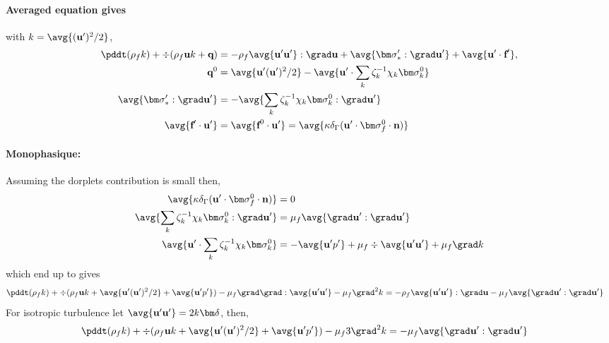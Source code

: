 \paragraph{Averaged equation gives }
with $k = \avg{(\textbf{u}')^2/2}$,
\begin{align*}
    \pddt(\rho_f k )
    + \div (
        \rho_f \textbf{u} k
        + \textbf{q}
        )
    &= 
    - \rho_f \avg{\textbf{u}'\textbf{u}'}:\grad \textbf{u}
    + \avg{\bm\sigma_*' : \grad \textbf{u}'}
    + \avg{\textbf{u}'\cdot \textbf{f}'},\\
    \textbf{q}^0 &= 
    \avg{\textbf{u}' (\textbf{u}')^2/2}
    - \avg{\textbf{u}' \cdot \sum_k \zeta^{-1}_k \chi_k \bm\sigma_k^0}
    \\
    \avg{\bm\sigma_*': \grad \textbf{u}'}
    &=
    -\avg{\sum_k \zeta^{-1}_k \chi_k \bm\sigma_k^0  :\grad \textbf{u}'}\\
    \avg{\textbf{f}'\cdot \textbf{u}'}
    &=
    \avg{\textbf{f}^0 \cdot \textbf{u}'}
    = 
    \avg{\kappa \delta_\Gamma (\textbf{u}'\cdot \bm\sigma_f^0 \cdot \textbf{n})}
\end{align*}
\paragraph{Monophasique: }
Assuming the dorplets contribution is small then, 
\begin{align}
    \avg{\kappa \delta_\Gamma (\textbf{u}'\cdot \bm\sigma_f^0 \cdot \textbf{n})}&= 0 \\
    \avg{\sum_k \zeta^{-1}_k \chi_k \bm\sigma_k^0  :\grad \textbf{u}'}
    &=
    \mu_f \avg{ \grad \textbf{u}'  :\grad \textbf{u}'}\\
    \avg{\textbf{u}' \cdot \sum_k \zeta^{-1}_k \chi_k \bm\sigma_k^0}
    &=
    -\avg{\textbf{u}' p'}
    + 
    \mu_f \div \avg{\textbf{u}'\textbf{u}'}  + \mu_f  \grad k 
\end{align}
which end up to gives 
\begin{align*}
    \pddt(\rho_f k )
    + \div (
        \rho_f \textbf{u} k
        +\avg{\textbf{u}' (\textbf{u}')^2/2}
        + \avg{\textbf{u}' p'}
        )
    - \mu_f \grad\grad : \avg{\textbf{u}'\textbf{u}'}  
    - \mu_f  \grad^2 k 
    &= 
    - \rho_f \avg{\textbf{u}'\textbf{u}'}:\grad \textbf{u}
    - \mu_f \avg{\grad \textbf{u}':\grad \textbf{u}'}
\end{align*}
For isotropic turbulence let $\avg{\textbf{u}'\textbf{u}'} = 2 k \bm\delta$, then, 
\begin{align*}
    \pddt(\rho_f k )
    + \div (
        \rho_f \textbf{u} k
        +\avg{\textbf{u}' (\textbf{u}')^2/2}
        + \avg{\textbf{u}' p'}
        )
    - \mu_f  3\grad^2 k 
    &= 
    - \mu_f \avg{\grad \textbf{u}':\grad \textbf{u}'}
\end{align*}
